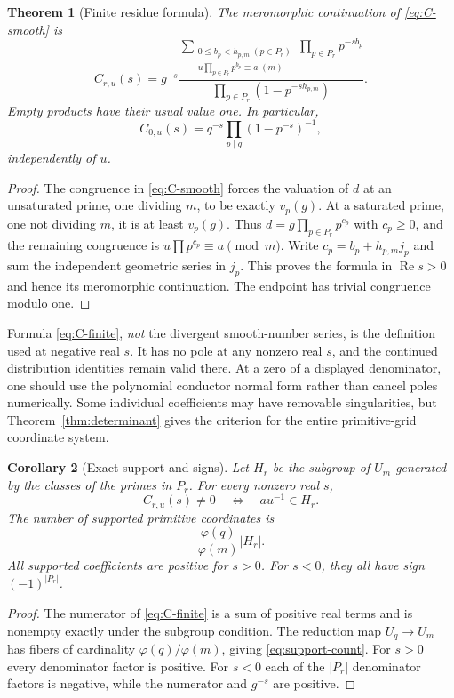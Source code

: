 \documentclass[11pt]{article}
\numberwithin{equation}{section}
\newtheorem{theorem}{Theorem}[section]
\newtheorem{corollary}[theorem]{Corollary}
\theoremstyle{definition}
\theoremstyle{remark}
\DeclareMathOperator{\Ree}{Re}
\begin{document}
\begin{theorem}[Finite residue formula]\label{thm:finite-C}
The meromorphic continuation of \eqref{eq:C-smooth} is
\begin{equation}\label{eq:C-finite}
 C_{r,u}(s)=g^{-s}
 \frac{\displaystyle
 \sum_{\substack{0\le b_p<h_{p,m}\;(p\in P_r)\\
 u\prod_{p\in P_r}p^{b_p}\equiv a\;(m)}}
 \prod_{p\in P_r}p^{-s b_p}}
 {\displaystyle\prod_{p\in P_r}(1-p^{-s h_{p,m}})}.
\end{equation}
Empty products have their usual value one. In particular,
\begin{equation}\label{eq:C-endpoint}
 C_{0,u}(s)=q^{-s}\prod_{p\mid q}(1-p^{-s})^{-1},
\end{equation}
independently of $u$.
\end{theorem}
\begin{proof}
The congruence in \eqref{eq:C-smooth} forces the valuation of $d$ at
an unsaturated prime, one dividing $m$, to be exactly $v_p(g)$.
At a saturated prime, one not dividing $m$, it is at least $v_p(g)$.
Thus $d=g\prod_{p\in P_r}p^{c_p}$ with $c_p\ge0$, and the remaining
congruence is $u\prod p^{c_p}\equiv a\pmod m$.
Write $c_p=b_p+h_{p,m}j_p$ and sum the independent geometric series in
$j_p$. This proves the formula in $\Ree s>0$ and hence its meromorphic
continuation. The endpoint has trivial congruence modulo one.
\end{proof}

Formula \eqref{eq:C-finite}, \emph{not} the divergent smooth-number
series, is the definition used at negative real $s$. It has no pole at
any nonzero real $s$, and the continued distribution identities remain
valid there. At a zero of a displayed denominator, one should use the
polynomial conductor normal form rather than cancel poles numerically.
Some individual coefficients may have removable singularities, but
Theorem~\ref{thm:determinant} gives the criterion for the entire
primitive-grid coordinate system.

\begin{corollary}[Exact support and signs]\label{cor:support}
Let $H_r$ be the subgroup of $U_m$ generated by the classes of the
primes in $P_r$. For every nonzero real $s$,
\[
 C_{r,u}(s)\ne0\quad\Longleftrightarrow\quad au^{-1}\in H_r.
\]
The number of supported primitive coordinates is
\begin{equation}\label{eq:support-count}
 \frac{\varphi(q)}{\varphi(m)}|H_r|.
\end{equation}
All supported coefficients are positive for $s>0$. For $s<0$, they
all have sign $(-1)^{|P_r|}$.
\end{corollary}
\begin{proof}
The numerator of \eqref{eq:C-finite} is a sum of positive real terms
and is nonempty exactly under the subgroup condition. The reduction
map $U_q\to U_m$ has fibers of cardinality
$\varphi(q)/\varphi(m)$, giving \eqref{eq:support-count}.
For $s>0$ every denominator factor is positive. For $s<0$ each of the
$|P_r|$ denominator factors is negative, while the numerator and
$g^{-s}$ are positive.
\end{proof}
\end{document}
